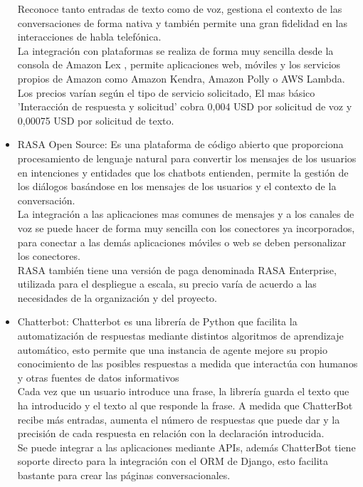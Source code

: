 \begin{itemize}
	      Reconoce tanto entradas de texto como de voz, gestiona el contexto de las conversaciones de
	      forma nativa y también permite una gran fidelidad en las interacciones de habla telefónica.\\
	      La integración con plataformas se realiza de forma muy sencilla desde la consola de Amazon
	      Lex , permite aplicaciones web, móviles y los servicios propios de Amazon como Amazon Kendra,
	      Amazon Polly o AWS Lambda.\\
	      Los precios varían según el tipo de servicio solicitado, El mas básico 'Interacción de
	      respuesta y solicitud' cobra 0,004 USD por solicitud de voz y 0,00075 USD por solicitud de
	      texto.\cite{Amazon_Lex}
	\item RASA Open Source:
	      Es una plataforma de código abierto que proporciona procesamiento de lenguaje natural para
	      convertir los mensajes de los usuarios en intenciones y entidades que los chatbots entienden,
	      permite la gestión de los diálogos basándose en los mensajes de los usuarios y el contexto de la
	      conversación.\\
	      La integración a las aplicaciones mas comunes de mensajes y a los canales de voz se puede hacer
	      de forma muy sencilla con los conectores ya incorporados, para conectar a las demás aplicaciones
	      móviles o web se deben personalizar los conectores.\\
	      RASA también tiene una versión de paga denominada RASA Enterprise, utilizada para el despliegue
	      a escala, su precio varía de acuerdo a las necesidades de la organización y del
	      proyecto.\cite{Rasa}
	\item Chatterbot:
	      Chatterbot es una librería de Python que facilita la automatización de respuestas mediante
	      distintos algoritmos de aprendizaje automático, esto permite que una instancia de agente mejore su
	      propio conocimiento de las posibles respuestas a medida que interactúa con humanos y otras fuentes
	      de datos informativos\\
	      Cada vez que un usuario introduce una frase, la librería guarda el texto que ha introducido y
	      el texto al que responde la frase. A medida que ChatterBot recibe más entradas, aumenta el número
	      de respuestas que puede dar y la precisión de cada respuesta en relación con la declaración
	      introducida.\\
	      Se puede integrar a las aplicaciones mediante APIs, además ChatterBot tiene soporte directo
	      para la integración con el ORM de Django, esto facilita bastante para crear las páginas
	      conversacionales.\cite{Chatterbot}\\
\end{itemize}

